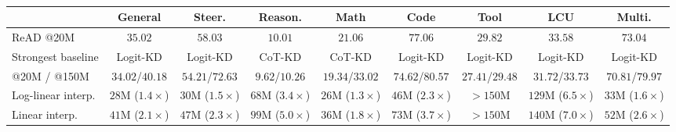 \begin{table}[t]
  \centering
  \caption{}
  \label{tab:equiv_budget}
  \scriptsize
  \setlength{\tabcolsep}{2pt}
  \renewcommand{\arraystretch}{0.92}
  \begin{tabular*}{\linewidth}{@{\extracolsep{\fill}}lcccccccc@{}}
    \toprule
    & \textbf{General} & \textbf{Steer.} & \textbf{Reason.} & \textbf{Math} & \textbf{Code} & \textbf{Tool} & \textbf{LCU} & \textbf{Multi.} \\
    \midrule
    ReAD @20M & $35.02$ & $58.03$ & $10.01$ & $21.06$ & $77.06$ & $29.82$ & $33.58$ & $73.04$ \\
    Strongest baseline & Logit-KD & Logit-KD & CoT-KD & CoT-KD & Logit-KD & Logit-KD & Logit-KD & Logit-KD \\
    \quad @20M / @150M & $34.02$/$40.18$ & $54.21$/$72.63$ & $9.62$/$10.26$ & $19.34$/$33.02$ & $74.62$/$80.57$ & $27.41$/$29.48$ & $31.72$/$33.73$ & $70.81$/$79.97$ \\
    \midrule
    Log-linear interp. & $28$M ($1.4\times$) & $30$M ($1.5\times$) & $68$M ($3.4\times$) & $26$M ($1.3\times$) & $46$M ($2.3\times$) & $>150$M & $129$M ($6.5\times$) & $33$M ($1.6\times$) \\
    Linear interp. & $41$M ($2.1\times$) & $47$M ($2.3\times$) & $99$M ($5.0\times$) & $36$M ($1.8\times$) & $73$M ($3.7\times$) & $>150$M & $140$M ($7.0\times$) & $52$M ($2.6\times$) \\
    \bottomrule
  \end{tabular*}
\end{table}
